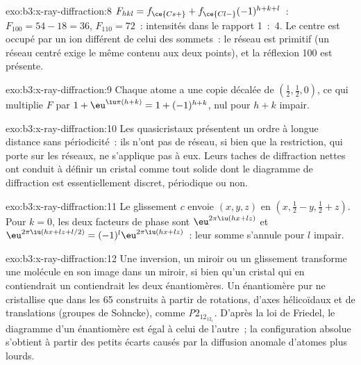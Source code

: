 \begin{solution}{exo:b3:x-ray-diffraction:8}
$F_{hkl} = f_{\ce{Cs+}} + f_{\ce{Cl-}}(-1)^{h+k+l}$~: $F_{100} = 54 - 18 = 36$, $F_{110} = 72$~:
intensités dans le rapport 1~:~4. Le centre est occupé par un ion
différent de celui des sommets~: le réseau est primitif (un réseau centré
exige le même contenu aux deux points), et la réflexion 100 est
présente.
\end{solution}

\begin{solution}{exo:b3:x-ray-diffraction:9}
Chaque atome a une copie décalée de $(\frac12,\frac12,0)$, ce qui
multiplie $F$ par $1 +
\eu^{\iu\pi(h+k)} = 1 + (-1)^{h+k}$, nul pour $h + k$ impair.
\end{solution}

\begin{solution}{exo:b3:x-ray-diffraction:10}
Les quasicristaux présentent un ordre à longue distance sans
périodicité~: ils n'ont pas de réseau, si bien que la restriction, qui
porte sur les réseaux, ne s'applique pas à eux. Leurs taches de
diffraction nettes ont conduit à définir un cristal comme tout solide
dont le diagramme de diffraction est essentiellement discret, périodique
ou non.
\end{solution}

\begin{solution}{exo:b3:x-ray-diffraction:11}
Le glissement $c$ envoie $(x, y, z)$ en $(x, \frac12 - y, \frac12 + z)$.
Pour $k = 0$, les deux
facteurs de phase sont $\eu^{2\pi\iu(hx + lz)}$ et $\eu^{2\pi\iu(hx + lz + l/2)} = (-1)^l
\eu^{2\pi\iu(hx+lz)}$~: leur somme s'annule pour $l$ impair.
\end{solution}

\begin{solution}{exo:b3:x-ray-diffraction:12}
Une inversion, un miroir ou un glissement transforme une molécule en son
image dans un miroir, si bien qu'un cristal qui en contiendrait un
contiendrait les deux énantiomères. Un énantiomère pur ne cristallise que
dans les 65  construits à partir de rotations, d'axes
hélicoïdaux et de translations (groupes de Sohncke), comme
\textit{P}$2_12_12_1$. D'après la loi de Friedel, le diagramme d'un
énantiomère est égal à celui de l'autre~; la configuration absolue
s'obtient à partir des petits écarts causés par la diffusion anomale
d'atomes plus lourds.
\end{solution}

